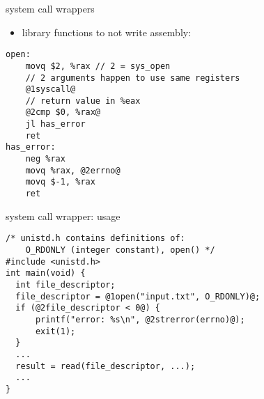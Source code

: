 
\begin{frame}[fragile,label=syscallWrap]{system call wrappers}
\begin{itemize}
    \item library functions to not write assembly:
\end{itemize}
\begin{lstlisting}
open:
    movq $2, %rax // 2 = sys_open
    // 2 arguments happen to use same registers
    @1syscall@
    // return value in %eax
    @2cmp $0, %rax@
    jl has_error
    ret
has_error:
    neg %rax
    movq %rax, @2errno@
    movq $-1, %rax
    ret
\end{lstlisting}
\end{frame}

\begin{frame}[fragile,label=syscallUsage]{system call wrapper: usage}
\begin{lstlisting}
/* unistd.h contains definitions of:
    O_RDONLY (integer constant), open() */
#include <unistd.h>
int main(void) {
  int file_descriptor;
  file_descriptor = @1open("input.txt", O_RDONLY)@;
  if (@2file_descriptor < 0@) {
      printf("error: %s\n", @2strerror(errno)@);
      exit(1);
  }
  ...
  result = read(file_descriptor, ...);
  ...
}
\end{lstlisting}
\end{frame}
